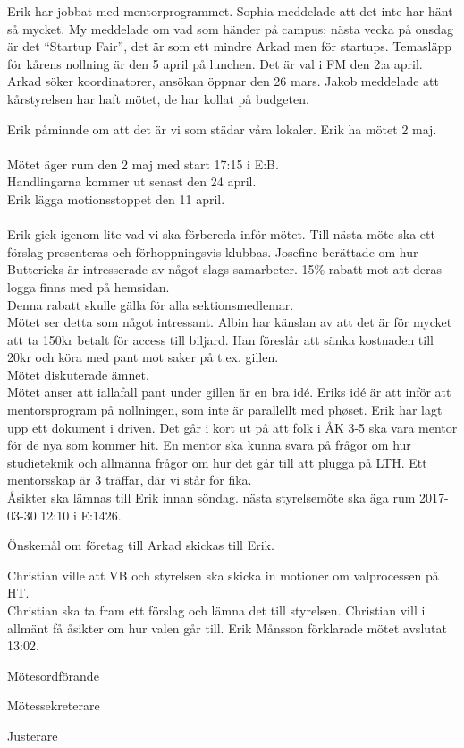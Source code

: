 \documentclass[10pt]{article}
\def\mo{Erik Månsson}
\def\ms{Johan Karlberg}
\def\ji{Niklas Gustafson}
\begin{document}
\begin{paragrafer}
\begin{paragrafer}
Erik har jobbat med mentorprogrammet.
Sophia meddelade att det inte har hänt så mycket.
My meddelade om vad som händer på campus; nästa vecka på onsdag är det ``Startup Fair'', det är som ett mindre Arkad men för startups. Temasläpp för kårens nollning är den 5 april på lunchen. Det är val i FM den 2:a april. Arkad söker koordinatorer, ansökan öppnar den 26 mars.
Jakob meddelade att kårstyrelsen har haft mötet, de har kollat på budgeten.
\end{paragrafer}
Erik påminnde om att det är vi som städar våra lokaler.
Erik \ypa ha mötet 2 maj.\\
\Mbaby\\
Mötet äger rum den 2 maj med start 17:15 i E:B.\\
Handlingarna kommer ut senast den 24 april.\\
Erik \ypa lägga motionsstoppet den 11 april.\\
\Mbaby\\
Erik gick igenom lite vad vi ska förbereda inför mötet.
Till nästa möte ska ett förslag presenteras och förhoppningsvis klubbas.
Josefine berättade om hur Buttericks är intresserade av något slags samarbeter. 15\% rabatt mot att deras logga finns med på hemsidan.\\
Denna rabatt skulle gälla för alla sektionsmedlemar.\\
Mötet ser detta som något intressant.
Albin har känslan av att det är för mycket att ta 150kr betalt för access till biljard. Han föreslår att sänka kostnaden till 20kr och köra med pant mot saker på t.ex. gillen.\\
Mötet diskuterade ämnet.\\
Mötet anser att iallafall pant under gillen är en bra idé.
Eriks idé är att inför att mentorsprogram på nollningen, som inte är parallellt med phøset. Erik har lagt upp ett dokument i driven. Det går i kort ut på att folk i ÅK 3-5 ska vara mentor för de nya som kommer hit. En mentor ska kunna svara på frågor om hur studieteknik och allmänna frågor om hur det går till att plugga på LTH. Ett mentorsskap är 3 träffar, där vi står för fika.\\
Åsikter ska lämnas till Erik innan söndag.
{\Mba}nästa styrelsemöte ska äga rum 2017-03-30 12:10 i E:1426.

{\Ibfu}

Önskemål om företag till Arkad skickas till Erik.

Christian ville att VB och styrelsen ska skicka in motioner om valprocessen på HT.\\ Christian ska ta fram ett förslag och lämna det till styrelsen. Christian vill i allmänt få åsikter om hur valen går till.
{\mo} förklarade mötet avslutat 13:02.

\end{paragrafer}

\hidesignfoot
\begin{signatures}{3}
\signature{\mo}{Mötesordförande}
\signature{\ms}{Mötessekreterare}
\signature{\ji}{Justerare}
\end{signatures}
\end{document}

